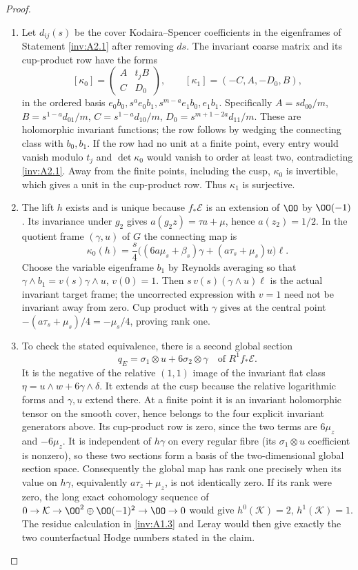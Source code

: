 \begin{proof}
\begin{enumerate}[label=\arabic*.,leftmargin=*]
\item Let $d_{ij}(s)$ be the cover Kodaira--Spencer coefficients in the
eigenframes of Statement \ref{inv:A2.1} after removing $ds$.
The invariant coarse matrix and its cup-product row have the forms
\[
[\kappa_0]=\begin{pmatrix}A&t_jB\\C&D_0\end{pmatrix},\qquad
[\kappa_1]=(-C,A,-D_0,B),
\]
in the ordered basis
$e_0b_0,s^ae_0b_1,s^{m-a}e_1b_0,e_1b_1$.  Specifically
$A=sd_{00}/m$, $B=s^{1-a}d_{01}/m$,
$C=s^{1-a}d_{10}/m$, $D_0=s^{m+1-2a}d_{11}/m$.
These are holomorphic invariant functions; the row follows by
wedging the connecting class with $b_0,b_1$.
If the row had no unit at a finite point, every entry would vanish
modulo $t_j$ and $\det\kappa_0$ would vanish to order at least two,
contradicting \ref{inv:A2.1}.  Away from the finite points, including the cusp,
$\kappa_0$ is invertible, which gives a unit in the cup-product row.
Thus $\kappa_1$ is surjective.

\item The lift $h$ exists and is unique because $f_*\mathcal E$ is an
extension of $\OO$ by $\OO(-1)$.  Its invariance under $g_2$ gives
$a(g_2z)=\tau a+\mu$, hence $a(z_2)=1/2$.
In the quotient frame $(\gamma,u)$ of $G$ the connecting map is
\[
\kappa_0(h)=\frac{s}{4}
\bigl((6a\mu_s+\beta_s)\gamma+(a\tau_s+\mu_s)u\bigr)\ell.
\]
Choose the variable eigenframe $b_1$ by Reynolds averaging so that
$\gamma\wedge b_1=v(s)\gamma\wedge u$, $v(0)=1$.
Then $s\,v(s)(\gamma\wedge u)\ell$ is the actual invariant
target frame; the uncorrected expression with $v=1$ need not be
invariant away from zero.  Cup product with $\gamma$ gives at the
central point $-(a\tau_s+\mu_s)/4=-\mu_s/4$, proving rank one.

\item To check the stated equivalence, there is a second global section
\[
q_E=\sigma_1\otimes u+6\sigma_2\otimes\gamma
\quad\text{of }R^1f_*\mathcal E.
\]
It is the negative of the relative $(1,1)$ image of the invariant
flat class $\eta=u\wedge w+6\gamma\wedge\delta$.
It extends at the cusp because the relative logarithmic forms and
$\gamma,u$ extend there.  At a finite point it is an invariant
holomorphic tensor on the smooth cover, hence belongs to the four
explicit invariant generators above.  Its cup-product row is zero,
since the two terms are $6\mu_z$ and $-6\mu_z$.
It is independent of $h\gamma$ on every regular fibre (its
$\sigma_1\otimes u$ coefficient is nonzero), so these two sections
form a basis of the two-dimensional global section space.
Consequently the global map has rank one precisely when its value
on $h\gamma$, equivalently $a\tau_z+\mu_z$, is not identically
zero.  If its rank were zero, the long exact cohomology sequence of
$0\to\mathcal K\to\OO^2\oplus\OO(-1)^2\to\OO\to0$
would give $h^0(\mathcal K)=2$, $h^1(\mathcal K)=1$.
The residue calculation in \ref{inv:A1.3} and Leray would then give exactly
the two counterfactual Hodge numbers stated in the claim.
\end{enumerate}
\end{proof}

